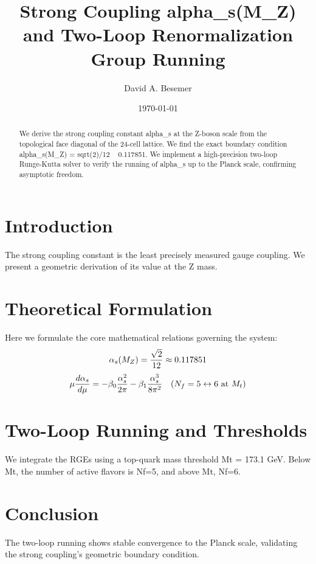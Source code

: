 \documentclass[amsmath,amssymb,aps,prd,twocolumn,superscriptaddress,nofootinbib]{revtex4-2}
\begin{document}

\title{Strong Coupling alpha_s(M_Z) and Two-Loop Renormalization Group Running}

\author{David A. Besemer}

\date{\today}

\begin{abstract}
We derive the strong coupling constant alpha_s at the Z-boson scale from the topological face diagonal of the 24-cell lattice. We find the exact boundary condition alpha_s(M_Z) = sqrt(2)/12 ~ 0.117851. We implement a high-precision two-loop Runge-Kutta solver to verify the running of alpha_s up to the Planck scale, confirming asymptotic freedom.
\end{abstract}

\maketitle

\section{Introduction}
The strong coupling constant is the least precisely measured gauge coupling. We present a geometric derivation of its value at the Z mass.

\section{Theoretical Formulation}
Here we formulate the core mathematical relations governing the system:
\begin{equation}
  \alpha_s(M_Z) = \frac{\sqrt{2}}{12} \approx 0.117851
\end{equation}
\begin{equation}
  \mu \frac{d\alpha_s}{d\mu} = -\beta_0 \frac{\alpha_s^2}{2\pi} - \beta_1 \frac{\alpha_s^3}{8\pi^2} \quad (N_f = 5 \leftrightarrow 6 \text{ at } M_t)
\end{equation}
\section{Two-Loop Running and Thresholds}
We integrate the RGEs using a top-quark mass threshold Mt = 173.1 GeV. Below Mt, the number of active flavors is Nf=5, and above Mt, Nf=6.

\section{Conclusion}
The two-loop running shows stable convergence to the Planck scale, validating the strong coupling's geometric boundary condition.
\end{document}
